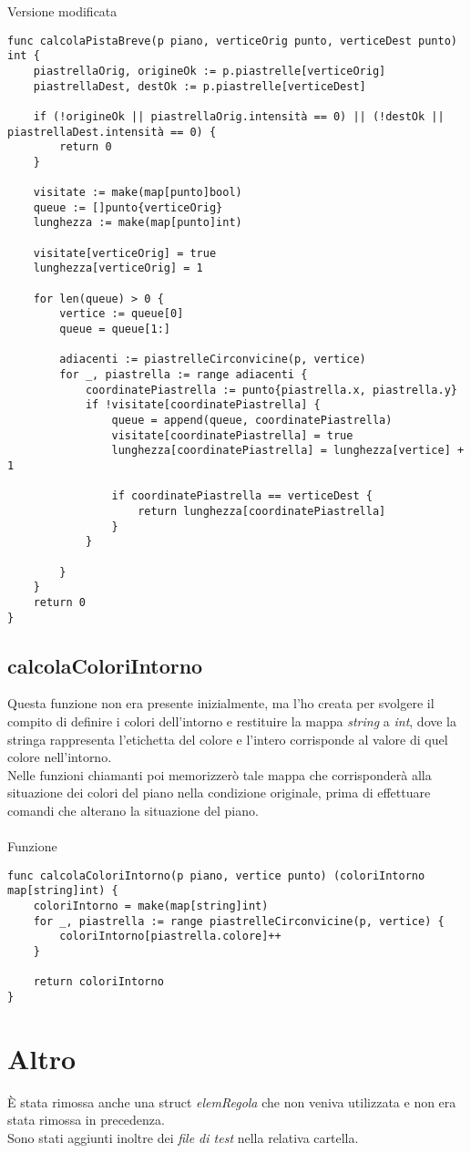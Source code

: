 \documentclass{article}
\begin{document}
Versione modificata
\begin{verbatim}
func calcolaPistaBreve(p piano, verticeOrig punto, verticeDest punto) int {
	piastrellaOrig, origineOk := p.piastrelle[verticeOrig]
	piastrellaDest, destOk := p.piastrelle[verticeDest]

	if (!origineOk || piastrellaOrig.intensità == 0) || (!destOk || piastrellaDest.intensità == 0) {
		return 0
	}

	visitate := make(map[punto]bool)
	queue := []punto{verticeOrig}
	lunghezza := make(map[punto]int)

	visitate[verticeOrig] = true
	lunghezza[verticeOrig] = 1

	for len(queue) > 0 {
		vertice := queue[0]
		queue = queue[1:]

		adiacenti := piastrelleCirconvicine(p, vertice)
		for _, piastrella := range adiacenti {
			coordinatePiastrella := punto{piastrella.x, piastrella.y}
			if !visitate[coordinatePiastrella] {
				queue = append(queue, coordinatePiastrella)
				visitate[coordinatePiastrella] = true
				lunghezza[coordinatePiastrella] = lunghezza[vertice] + 1

				if coordinatePiastrella == verticeDest {
					return lunghezza[coordinatePiastrella]
				}
			}

		}
	}
	return 0
}
\end{verbatim}

\subsection{calcolaColoriIntorno}\label{subsec:calcolaColoriIntorno}
Questa funzione non era presente inizialmente, ma l'ho creata per svolgere il compito di definire i colori dell'intorno e restituire la mappa \textit{string} a \textit{int}, dove la stringa rappresenta l'etichetta del colore e l'intero corrisponde al valore di quel colore nell'intorno.\\
Nelle funzioni chiamanti poi memorizzerò tale mappa che corrisponderà alla situazione dei colori del piano nella condizione originale, prima di effettuare comandi che alterano la situazione del piano.
\\ \\
Funzione
\begin{verbatim}
func calcolaColoriIntorno(p piano, vertice punto) (coloriIntorno map[string]int) {
	coloriIntorno = make(map[string]int)
	for _, piastrella := range piastrelleCirconvicine(p, vertice) {
		coloriIntorno[piastrella.colore]++
	}

	return coloriIntorno
}
\end{verbatim}

\section{Altro}
È stata rimossa anche una struct \textit{elemRegola} che non veniva utilizzata e non era stata rimossa in precedenza.\\
Sono stati aggiunti inoltre dei \textit{file di test} nella relativa cartella.
\end{document}
